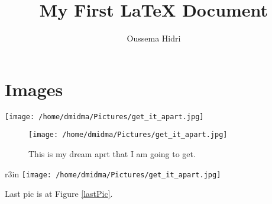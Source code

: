 \documentclass{article}
\author{Oussema Hidri}
\title{My First {\LaTeX} Document}
\date{}
\begin{document}
\maketitle

\section{Images}

\begin{center}
\texttt{[image: /home/dmidma/Pictures/get\_it\_apart.jpg]}
\end{center}

\blindtext

\blindtext


\begin{figure}
\texttt{[image: /home/dmidma/Pictures/get\_it\_apart.jpg]}
\caption{This is my dream aprt that I am going to get.}
\end{figure}



\blindtext

\blindtext

\blindtext

\begin{wrapfigure}{r}{3in}
\centering
\texttt{[image: /home/dmidma/Pictures/get\_it\_apart.jpg]}
\caption{Just a caption\label{lastPic}}
\end{wrapfigure}


\blindtext

Last pic is at Figure \ref{lastPic}.
\end{document}
